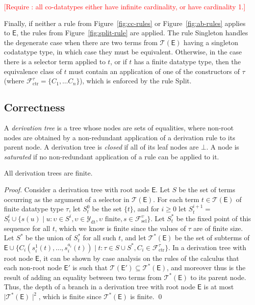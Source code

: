 \documentclass[a4paper,oribibl,envcountsame,draft]{llncs}
\newcommand{\Ec}{\mathsf{E}}
\newcommand{\tEc}{\mathcal{T}(\Ec)}
\newcommand{\tcEc}{\mathcal{T}^\ast(\Ec)}
\newcommand{\rn}[1]{\textsf{\small #1}}
\newcommand{\rem}[1]{\textcolor{red}{[#1]}}
\newcommand\Types{\mathcal{Y}}
\newcommand\Funcs{\mathcal{F}}
\newcommand\Data{\Types_{\mathrm{dt}}}
\newcommand\Ctr{\Funcs_{\mathrm{ctr}}}
\newcommand\Sel{\Funcs_{\mathrm{sel}}}
\begin{document}
\rem{Require : all co-datatypes either have infinite cardinality, or have cardinality 1.}

Finally, if neither a rule from Figure~\ref{fig:cc-rules} or Figure~\ref{fig:ab-rules} applies to $\Ec$, 
the rules from Figure~\ref{fig:split-rule} are applied.
The rule \rn{Singleton} handles the degenerate case when there are two terms from $\tEc$ having a singleton codatatype type,
in which case they must be equivalent.
Otherwise, in the case there is a selector term applied to $t$, or if $t$ has a finite datatype type, 
then the equivalence class of $t$ must contain an application of one of the constructors of $\tau$ (where $\Ctr^\tau = \{ C_1, \ldots C_n \}$), 
which is enforced by the rule \rn{Split}.

\subsection{Correctness}

A \emph{derivation tree} is a tree whose nodes are sets of equalities, where non-root nodes are obtained by 
a non-redundant application of a derivation rule to its parent node.
A derivation tree is \emph{closed} if all of its leaf nodes are $\bot$.
A node is \emph{saturated} if no non-redundant application of a rule can be applied to it.

\begin{lemma}[Termination]
All derivation trees are finite.
\end{lemma}
\begin{proof}
Consider a derivation tree with root node $\Ec$.
Let $S$ be the set of terms occurring as the argument of a selector in $\tEc$.
For each term $t \in \tEc$ of finite datatype type $\tau$,
let $S^0_t$ be the set $\{ t \}$,
and for $i \geq 0$ let $S^{i+1}_t =$ $S^i_t \cup \{ s( u ) \mid u : \upsilon \in S^i, \upsilon \in \Data, \upsilon \text{ finite}, s \in \Sel^{\upsilon}  \}$.
Let $S^\ast_t$ be the fixed point of this sequence for all $t$, which we know is finite since the values of $\tau$ are of finite size.
Let $S^\ast$ be the union of $S^\ast_t$ for all such $t$,
and let $\tcEc$ be the set of subterms of $\Ec \cup \{ C_i( s^1_i( t ), \ldots, s^{a_i}_i( t ) ) \mid t : \tau \in S \cup S^\ast, C_i \in \Ctr^\tau \}$.
In a derivation tree with root node $\Ec$, 
it can be shown by case analysis on the rules of the calculus that each non-root node $\Ec'$ is such that 
$\mathcal{T}(\Ec') \subseteq \tcEc $, and moreover thus is the result of adding an equality between two terms from $\tcEc$ to its parent node.
Thus, the depth of a branch in a derivation tree with root node $\Ec$ is at most $\mid \tcEc \mid^2$,
which is finite since $\tcEc$ is finite.
\qed
\end{proof}
\end{document}
